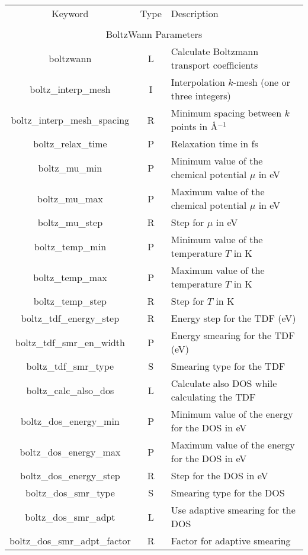 \begin{table}[hH!]
\begin{center}
\begin{tabular}{|c|c|p{6cm}|}
\hline
Keyword & Type & Description \\
        &      &             \\
\hline\hline
\multicolumn{3}{|c|}{BoltzWann Parameters} \\
\hline
{\sc boltzwann}   & L & Calculate Boltzmann transport coefficients \\
{\sc boltz\_interp\_mesh} & I & Interpolation $k$-mesh (one or three integers)\\ 
{\sc boltz\_interp\_mesh\_spacing} & R & Minimum spacing between $k$ points in \AA$^{-1}$\\
{\sc boltz\_relax\_time} & P & Relaxation time in fs\\
{\sc boltz\_mu\_min} & P & Minimum value of the chemical potential $\mu$ in eV\\
{\sc boltz\_mu\_max} & P & Maximum value of the chemical potential $\mu$ in eV\\
{\sc boltz\_mu\_step} & R & Step for $\mu$ in eV\\
{\sc boltz\_temp\_min} & P & Minimum value of the temperature $T$ in K \\
{\sc boltz\_temp\_max} & P & Maximum value of the temperature $T$ in K \\
{\sc boltz\_temp\_step} & R & Step for $T$ in K \\
{\sc boltz\_tdf\_energy\_step} & R & Energy step for the TDF (eV) \\
{\sc boltz\_tdf\_smr\_en\_width} & P & Energy smearing for the TDF (eV) \\
{\sc boltz\_tdf\_smr\_type} & S & Smearing type for the TDF \\
{\sc boltz\_calc\_also\_dos} & L & Calculate also DOS while calculating the TDF\\
{\sc boltz\_dos\_energy\_min} & P & Minimum value of the energy for the DOS in eV \\
{\sc boltz\_dos\_energy\_max} & P & Maximum value of the energy for the DOS in eV \\
{\sc boltz\_dos\_energy\_step} & R & Step for the DOS in eV\\
{\sc boltz\_dos\_smr\_type} & S & Smearing type for the DOS \\
{\sc boltz\_dos\_smr\_adpt} & L & Use adaptive smearing for the DOS \\
{\sc boltz\_dos\_smr\_adpt\_factor} & R & Factor for adaptive smearing \\

\end{tabular}
\end{center}
\end{table}
